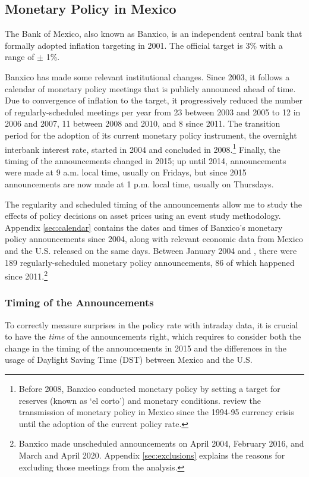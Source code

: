 \sectitlespace
\subsection{Monetary Policy in Mexico}
\sectitlespace
The Bank of Mexico, also known as Banxico, is an independent central bank that formally adopted inflation targeting in 2001. The official target is 3\% with a range of \(\pm\) 1\%. 

Banxico has made some relevant institutional changes. Since 2003, it follows a calendar of monetary policy meetings that is publicly announced ahead of time. Due to convergence of inflation to the target, it progressively reduced the number of regularly-scheduled meetings per year from 23 between 2003 and 2005 to 12 in 2006 and 2007, 11 between 2008 and 2010, and 8 since 2011. The transition period for the adoption of its current monetary policy instrument, the overnight interbank interest rate, started in 2004 and concluded in 2008.\footnote{Before 2008, Banxico conducted monetary policy by setting a target for reserves (known as `el corto') and monetary conditions. \textcite{SidaouiRF:2008} review the transmission of monetary policy in Mexico since the 1994-95 currency crisis until the adoption of the current policy rate.} Finally, the timing of the announcements changed in 2015; up until 2014, announcements were made at 9 a.m. local time, usually on Fridays, but since 2015 announcements are now made at 1 p.m. local time, usually on Thursdays. 

The regularity and scheduled timing of the announcements allow me to study the effects of policy decisions on asset prices using an event study methodology. Appendix \ref{sec:calendar} contains the dates and times of Banxico's monetary policy announcements since 2004, along with relevant economic data from Mexico and the U.S. released on the same days. Between January 2004 and \lastobsfx, there were 189 regularly-scheduled monetary policy announcements, 86 of which happened since 2011.\footnote{Banxico made unscheduled announcements on April 2004, February 2016, and March and April 2020. Appendix \ref{sec:exclusions} explains the reasons for excluding those meetings from the analysis.} 

\sectitlespace
\subsubsection{Timing of the Announcements} \label{sec:mptiming}
\sectitlespace

To correctly measure surprises in the policy rate with intraday data, it is crucial to have the \textit{time} of the announcements right, which requires to consider both the change in the timing of the announcements in 2015 and the differences in the usage of Daylight Saving Time (DST) between Mexico and the U.S.

